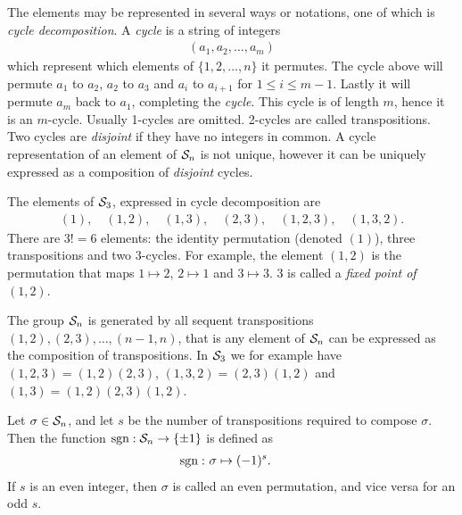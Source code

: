 The elements may be represented in several ways or notations, one of which is \textit{cycle decomposition}. A \textit{cycle} is a string of integers \begin{align*}
	(a_1, a_2, \dots, a_m)
\end{align*} which represent which elements of $\{1,2, \dots, n\}$ it permutes. The cycle above will permute $a_1$ to $a_2$, $a_2$ to $a_3$ and $a_{i}$ to $a_{i+1}$ for $1 \leq i \leq m-1$. Lastly it will permute $a_m$ back to $a_1$, completing the \textit{cycle}. This cycle is of length $m$, hence it is an $m$-cycle. Usually 1-cycles are omitted. 2-cycles are called transpositions. Two cycles are \textit{disjoint} if they have no integers in common. A cycle representation of an element of $\mathcal{S}_n$ is not unique, however it can be uniquely expressed as a composition of \textit{disjoint} cycles.

\begin{example}
	The elements of $\mathcal{S}_3$, expressed in cycle decomposition are
	\begin{align*}
		(1),\quad (1,2), \quad(1,3), \quad(2,3), \quad(1,2,3), \quad(1,3,2).
	\end{align*}
	There are $3! = 6$ elements: the identity permutation (denoted $(1)$), three transpositions and two 3-cycles. For example, the element $(1,2)$ is the permutation that maps $1 \mapsto 2$, $2 \mapsto 1$ and $3 \mapsto 3$. 3 is called a \textit{fixed point of $(1,2)$}.
\end{example}

\begin{note}
	The group $\mathcal{S}_n$ is generated by all sequent transpositions $(1,2), (2,3), \dots, (n-1,n)$, that is any element of $\mathcal{S}_n$ can be expressed as the composition of transpositions. In $\mathcal{S}_3$ we for example have $(1,2,3) = (1,2)(2,3)$, $(1,3,2) = (2,3)(1,2)$ and $(1,3) = (1,2)(2,3)(1,2)$.
\end{note}

\begin{definition}
	Let $\sigma \in \mathcal{S}_n$, and let $s$ be the number of transpositions required to compose $\sigma$. Then the function $\text{sgn}: \mathcal{S}_n \rightarrow \{\pm 1\}$ is defined as
	\begin{align*}
		\text{sgn}: & \ \sigma \mapsto (-1)^s.
	\end{align*}
	If $s$ is an even integer, then $\sigma$ is called an even permutation, and vice versa for an odd $s$.
\end{definition}

